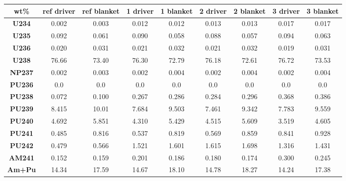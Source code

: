 	\begin{tabular}{c|cc|cc|cc|cc}
		\hline
		\textbf{wt\%} & \textbf{ref driver} & \textbf{ref blanket} & \textbf{1 driver} & \textbf{1 blanket} & \textbf{2 driver} & \textbf{2 blanket} & \textbf{3 driver} & \textbf{3 blanket} \\ 		\hline
		\textbf{U234} & 0.002 & 0.003 & 0.012 & 0.012 & 0.013 & 0.013 & 0.017 & 0.017 \\ 
		\textbf{U235} & 0.092 & 0.061 & 0.090 & 0.058 & 0.088 & 0.057 & 0.094 & 0.063 \\ 
		\textbf{U236} & 0.020 & 0.031 & 0.021 & 0.032 & 0.021 & 0.032 & 0.019 & 0.031 \\ 
		\textbf{U238} & 76.66 & 73.40 & 76.30 & 72.79 & 76.18 & 72.61 & 76.72 & 73.53 \\ 
		\textbf{NP237} & 0.002 & 0.003 & 0.002 & 0.004 & 0.002 & 0.004 & 0.002 & 0.004 \\ 
		\textbf{PU236} & 0.0 & 0.0 & 0.0 & 0.0 & 0.0 & 0.0 & 0.0 & 0.0 \\ 
		\textbf{PU238} & 0.072 & 0.100 & 0.267 & 0.286 & 0.284 & 0.296 & 0.368 & 0.386 \\ 
		\textbf{PU239} & 8.415 & 10.01 & 7.684 & 9.503 & 7.461 & 9.342 & 7.783 & 9.559 \\ 
		\textbf{PU240} & 4.692 & 5.851 & 4.310 & 5.429 & 4.515 & 5.609 & 3.519 & 4.605 \\ 
		\textbf{PU241} & 0.485 & 0.816 & 0.537 & 0.819 & 0.569 & 0.859 & 0.841 & 0.928 \\ 
		\textbf{PU242} & 0.479 & 0.566 & 1.521 & 1.601 & 1.615 & 1.698 & 1.316 & 1.431 \\ 
		\textbf{AM241} & 0.152 & 0.159 & 0.201 & 0.186 & 0.180 & 0.174 & 0.300 & 0.245 \\ 
		\hline
		\hline
		\textbf{Am+Pu} & 14.34 & 17.59 & 14.67 & 18.10 & 14.78 & 18.27 & 14.24 & 17.38 \\ 
		\hline 
	\end{tabular} 
